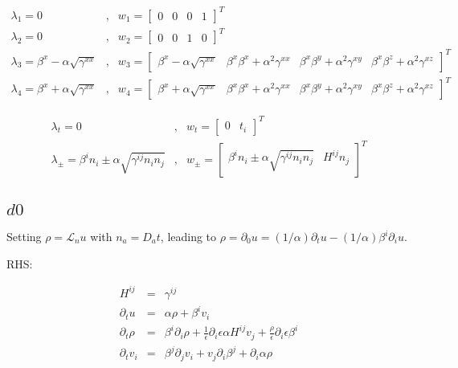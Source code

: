 \documentclass{article}
\begin{document}
\begin{eqnarray}
   \lambda_1 = 0 &, & w_1 = \left[ \begin{array}{cccc}
%
   0 & 0 & 0 & 1
%
   \end{array} \right]^T
\\
   \lambda_2 = 0 &, & w_2 = \left[ \begin{array}{cccc}
%
   0 & 0 & 1 & 0
%
   \end{array} \right]^T
\\
   \lambda_3 = \beta^x - \alpha \sqrt{\gamma^{xx}} &, & w_3 = \left[
   \begin{array}{cccc}
%
   \beta^x - \alpha \sqrt{\gamma^{xx}} &
   \beta^x \beta^x + \alpha^2 \gamma^{xx} &
   \beta^x \beta^y + \alpha^2 \gamma^{xy} &
   \beta^x \beta^z + \alpha^2 \gamma^{xz}
%
   \end{array} \right]^T
\\
   \lambda_4 = \beta^x + \alpha \sqrt{\gamma^{xx}} &, & w_4 = \left[
   \begin{array}{cccc}
%
   \beta^x + \alpha \sqrt{\gamma^{xx}} &
   \beta^x \beta^x + \alpha^2 \gamma^{xx} &
   \beta^x \beta^y + \alpha^2 \gamma^{xy} &
   \beta^x \beta^z + \alpha^2 \gamma^{xz}
%
   \end{array} \right]^T
\end{eqnarray}

\begin{eqnarray}
   \lambda_t = 0 &, & w_t = \left[ \begin{array}{cc}
%
   0 & t_i
%
   \end{array} \right]^T
\\
   \lambda_\pm = \beta^i n_i \pm \alpha \sqrt{\gamma^{ij} n_i n_j} &,
   & w_\pm = \left[ \begin{array}{cccc}
%
   \beta^i n_i \pm \alpha \sqrt{\gamma^{ij} n_i n_j} & H^{ij} n_j
%
   \end{array} \right]^T
\end{eqnarray}



\subsection{$d0$}

   Setting $\rho = \mathcal{L}_n u$ with $n_a = D_a t$, leading to
   $\rho = \partial_0 u = (1/\alpha) \partial_t u - (1/\alpha) \beta^i
   \partial_i u$.

   RHS:

\begin{eqnarray}
   H^{ij} & = & \gamma^{ij}
\\
   \partial_t u & = & \alpha \rho + \beta^i v_i
\\
   \partial_t \rho & = & \beta^i \partial_i \rho +
   \frac{1}{\epsilon} \partial_i \epsilon \alpha H^{ij} v_j +
   \frac{\rho}{\epsilon} \partial_i \epsilon \beta^i
\\
   \partial_t v_i & = & \beta^j \partial_j v_i + v_j \partial_i
   \beta^j + \partial_i \alpha \rho
\end{eqnarray}
\end{document}
